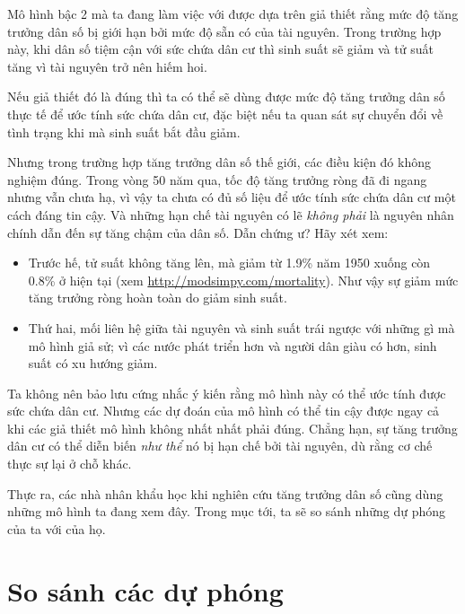 \documentclass[12pt, openany]{book}
\theoremstyle{exercise}
\begin{document}
Mô hình bậc 2 mà ta đang làm việc với được dựa trên giả thiết rằng mức độ tăng trưởng dân số bị giới hạn bởi mức độ sẵn có của tài nguyên. Trong trường hợp này, khi dân số tiệm cận với sức chứa dân cư thì sinh suất sẽ giảm và tử suất tăng vì tài nguyên trở nên hiếm hoi.


Nếu giả thiết đó là đúng thì ta có thể sẽ dùng được mức độ tăng trưởng dân số thực tế để ước tính sức chứa dân cư, đặc biệt nếu ta quan sát sự chuyển đổi về tình trạng khi mà sinh suất bắt đầu giảm.

Nhưng trong trường hợp tăng trưởng dân số thế giới, các điều kiện đó không nghiệm đúng. Trong vòng 50 năm qua, tốc độ tăng trưởng ròng đã đi ngang nhưng vẫn chưa hạ, vì vậy ta chưa có đủ số liệu để ước tính sức chứa dân cư một cách đáng tin cậy. Và những hạn chế tài nguyên có lẽ {\em không phải} là nguyên nhân chính dẫn đến sự tăng chậm của dân số. Dẫn chứng ư? Hãy xét xem:

\begin{itemize}

\item Trước hế, tử suất không tăng lên, mà giảm từ 1.9\% năm 1950 xuống còn 0.8\% ở hiện tại (xem \url{http://modsimpy.com/mortality}).  Như vậy sự giảm mức tăng trưởng ròng hoàn toàn do giảm sinh suất.


\item Thứ hai, mối liên hệ giữa tài nguyên và sinh suất trái ngược với những gì mà mô hình giả sử; vì các nước phát triển hơn và người dân giàu có hơn, sinh suất có xu hướng giảm.


\end{itemize} 

Ta không nên bảo lưu cứng nhắc ý kiến rằng mô hình này có thể ước tính được sức chứa dân cư. Nhưng các dự đoán của mô hình có thể tin cậy được ngay cả khi các giả thiết mô hình không nhất nhất phải đúng. Chẳng hạn, sự tăng trưởng dân cư có thể diễn biến {\em như thể} nó bị hạn chế bởi tài nguyên, dù rằng cơ chế thực sự lại ở chỗ khác.

Thực ra, các nhà nhân khẩu học khi nghiên cứu tăng trưởng dân số cũng dùng những mô hình ta đang xem đây. Trong mục tới, ta sẽ so sánh những dự phóng của ta với của họ.


\section{So sánh các dự phóng}
\end{document}
